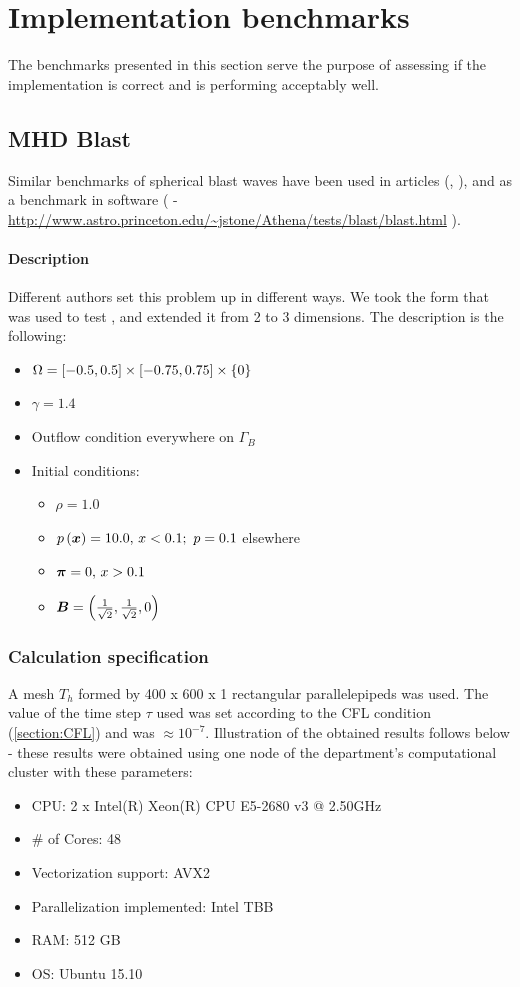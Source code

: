 \section{Implementation benchmarks}
The benchmarks presented in this section serve the purpose of assessing if the implementation is correct and is performing acceptably well.

\subsection{MHD Blast}
Similar benchmarks of spherical blast waves have been used in articles (\cite{blast1}, \cite{blast2}), and as a benchmark in software (\cite{athena} - \url{http://www.astro.princeton.edu/~jstone/Athena/tests/blast/blast.html} ).


\paragraph{Description}
Different authors set this problem up in different ways. We took the form that was used to test \cite{athena}, and extended it from 2 to 3 dimensions. The description is the following:
\begin{itemize}
    \item $\Omega = \left[-0.5, 0.5\right] \times \left[-0.75, 0.75\right] \times \{0\}$
    \item $\gamma = 1.4$
    \item Outflow condition everywhere on $\Gamma_B$
    \item Initial conditions:
    \begin{itemize}
        \item $\rho = 1.0$
        \item $p\left(\mbox{\boldmath $x$}\right) = 10.0,\,x<0.1;\ p = 0.1$ elsewhere
        \item $\mbox{\boldmath $\pi$} = 0,\,x>0.1$
        \item $\mbox{\boldmath $B$} = \left(\frac{1}{\sqrt{2}}, \frac{1}{\sqrt{2}}, 0\right)$
    \end{itemize}
   \end{itemize}

\subsubsection{Calculation specification}
A mesh $T_h$ formed by 400 x 600 x 1 rectangular parallelepipeds was used.
The value of the time step $\tau$ used was set according to the CFL condition (\ref{section:CFL}) and was $\approx 10^{-7}$.
Illustration of the obtained results follows below - these results were obtained using one node of the department's computational cluster with these parameters:
\begin{itemize}
    \item CPU: 2 x Intel(R) Xeon(R) CPU E5-2680 v3 @ 2.50GHz
    \item \# of Cores: 48
    \item Vectorization support: AVX2
    \item Parallelization implemented: Intel TBB
    \item RAM: 512 GB
    \item OS: Ubuntu 15.10
\end{itemize}

